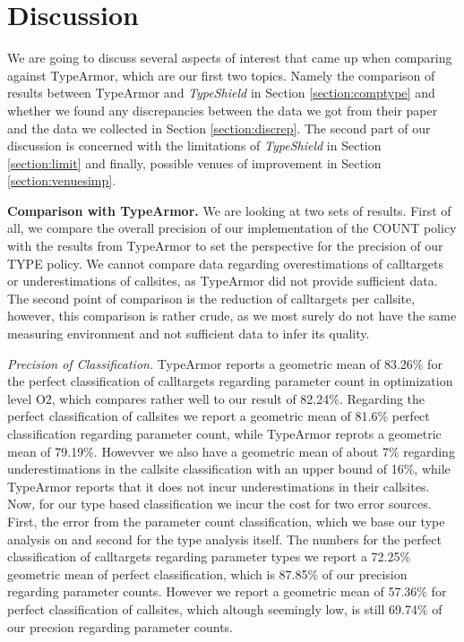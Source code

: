 \section{Discussion}
\label{chapter:Discussion}

We are going to discuss several aspects of interest that came up when comparing against TypeArmor, 
which are our first two topics. Namely the comparison of results between TypeArmor and \textit{TypeShield}
in Section \ref{section:comptype} and whether we found any discrepancies between the data we got from 
their paper and the data we collected in Section \ref{section:discrep}. The second part of our discussion
is concerned with the limitations of \textit{TypeShield} in Section \ref{section:limit} and finally, 
possible venues of improvement in Section \ref{section:venuesimp}.

\textbf{Comparison with TypeArmor.}
\label{section:comptype}
We are looking at two sets of results. First of all, we compare the overall precision of our implementation
of the COUNT policy with the results from TypeArmor to set the perspective for the precision of our TYPE 
policy. We cannot compare data regarding overestimations of calltargets or underestimations of callsites, 
as TypeArmor did not provide sufficient data. The second point of comparison is the reduction of calltargets
per callsite, however, this comparison is rather crude, as we most surely do not have the same measuring
environment and not sufficient data to infer its quality.

\textit{Precision of Classification.}
TypeArmor reports a geometric mean of 83.26\% for the perfect classification of calltargets regarding 
parameter count in optimization level O2, which compares rather well to our result of 82.24\%. Regarding
the perfect classification of callsites we report a geometric mean of 81.6\% perfect classification 
regarding parameter count, while TypeArmor reprots a geometric mean of 79.19\%. Howevver we also have
a geometric mean of about 7\% regarding underestimations in the callsite classification with an upper
bound of 16\%, while TypeArmor reports that it does not incur underestimations in their callsites.
Now, for our type based classification we incur the cost for two error sources. First, the error from
the parameter count classification, which we base our type analysis on and second for the type analysis
itself. The numbers for the perfect classification of calltargets regarding parameter types we report a
72.25\% geometric mean of perfect classification, which is 87.85\% of our precision regarding parameter
counts. However we report a geometric mean of 57.36\%
for perfect classification of callsites, which altough seemingly low, is still 69.74\% of our precsion
regarding parameter counts.

